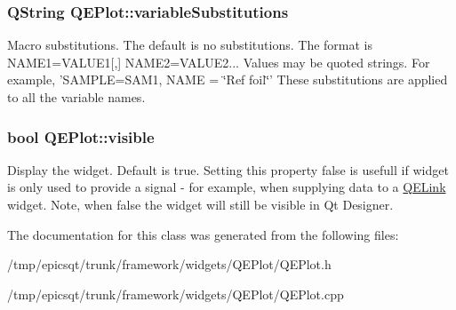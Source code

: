 \hypertarget{classQEPlot_a5df88f65fefb802459e9e9df1c3200b8}{
\subsubsection[{variableSubstitutions}]{\setlength{\rightskip}{0pt plus 5cm}QString QEPlot::variableSubstitutions}}
\label{classQEPlot_a5df88f65fefb802459e9e9df1c3200b8}
Macro substitutions. The default is no substitutions. The format is NAME1=VALUE1\mbox{[},\mbox{]} NAME2=VALUE2... Values may be quoted strings. For example, 'SAMPLE=SAM1, NAME = \char`\"{}Ref foil\char`\"{}' These substitutions are applied to all the variable names. \hypertarget{classQEPlot_aefce7f3abbebfba919e621d1e9227678}{
\subsubsection[{visible}]{\setlength{\rightskip}{0pt plus 5cm}bool QEPlot::visible}}
\label{classQEPlot_aefce7f3abbebfba919e621d1e9227678}
Display the widget. Default is true. Setting this property false is usefull if widget is only used to provide a signal -\/ for example, when supplying data to a \hyperlink{classQELink}{QELink} widget. Note, when false the widget will still be visible in Qt Designer. 

The documentation for this class was generated from the following files:\begin{DoxyCompactItemize}
\item 
/tmp/epicsqt/trunk/framework/widgets/QEPlot/QEPlot.h\item 
/tmp/epicsqt/trunk/framework/widgets/QEPlot/QEPlot.cpp\end{DoxyCompactItemize}
